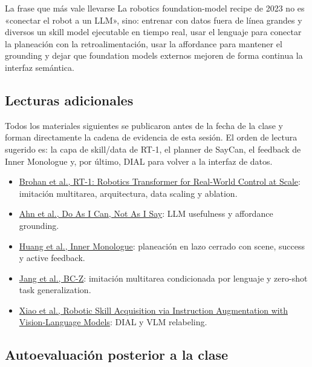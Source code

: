 \begin{importantbox}{La frase que más vale llevarse}
La robotics foundation-model recipe de 2023 no es «conectar el robot a un LLM», sino: entrenar con datos fuera de línea grandes y diversos un skill model ejecutable en tiempo real, usar el lenguaje para conectar la planeación con la retroalimentación, usar la affordance para mantener el grounding y dejar que foundation models externos mejoren de forma continua la interfaz semántica.
\end{importantbox}

\subsection{Lecturas adicionales}

Todos los materiales siguientes se publicaron antes de la fecha de la clase y forman directamente la cadena de evidencia de esta sesión. El orden de lectura sugerido es: la capa de skill/data de RT-1, el planner de SayCan, el feedback de Inner Monologue y, por último, DIAL para volver a la interfaz de datos.

\begin{itemize}
  \item \href{https://arxiv.org/abs/2212.06817}{Brohan et al., RT-1: Robotics Transformer for Real-World Control at Scale}: imitación multitarea, arquitectura, data scaling y ablation.
  \item \href{https://arxiv.org/abs/2204.01691}{Ahn et al., Do As I Can, Not As I Say}: LLM usefulness y affordance grounding.
  \item \href{https://arxiv.org/abs/2207.05608}{Huang et al., Inner Monologue}: planeación en lazo cerrado con scene, success y active feedback.
  \item \href{https://arxiv.org/abs/2202.02005}{Jang et al., BC-Z}: imitación multitarea condicionada por lenguaje y zero-shot task generalization.
  \item \href{https://arxiv.org/abs/2211.11736}{Xiao et al., Robotic Skill Acquisition via Instruction Augmentation with Vision-Language Models}: DIAL y VLM relabeling.
\end{itemize}

\subsection{Autoevaluación posterior a la clase}

